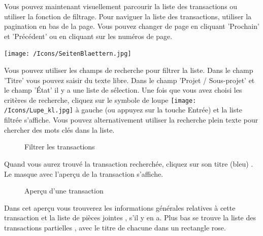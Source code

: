 Vous pouvez maintenant visuellement parcourir la liste des transactions ou utiliser la fonction de filtrage. Pour naviguer la liste des transactions, utiliser la pagination en bas de la page. Vous pouvez changer de page en cliquant 'Prochain' et 'Précédent' ou en cliquant sur les numéros de page.

\begin{center}
\texttt{[image: /Icons/SeitenBlaettern.jpg]}
\end{center}

Vous pouvez utiliser les champs de recherche pour filtrer la liste. Dans le champ 'Titre'  vous pouvez saisir du texte libre. Dans le champ 'Projet / Sous-projet'  et le champ 'État'  il y a une liste de sélection. Une fois que vous avez choisi les critères de recherche, cliquez sur le symbole de loupe \texttt{[image: /Icons/Lupe\_kl.jpg]}  à gauche (ou appuyez sur la touche Entrée) et la liste filtrée s'affiche. Vous pouvez alternativement utiliser la recherche plein texte pour chercher des mots clés dans la liste.

\begin{figure}[H]
\caption{Filtrer les transactions}
\end{figure}

Quand vous aurez trouvé la transaction recherchée, cliquez sur son titre (bleu) . Le masque avec l'aperçu de la transaction s'affiche.

\begin{figure}[H]
\caption{Aperçu d'une transaction}
\end{figure}

Dans cet aperçu vous trouverez les informations générales relatives à cette transaction  et la liste de pièces jointes , s'il y en a. Plus bas se trouve la liste des transactions partielles , avec le titre de chacune dans un rectangle rose.

